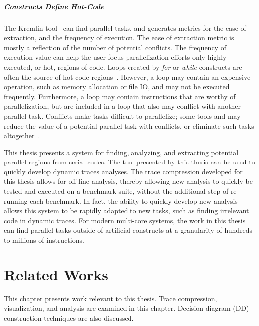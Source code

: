 \documentclass[defaultstyle,11pt]{thesis}
\begin{document}
\noindent\paragraph{Constructs Define Hot-Code}

The Kremlin tool~\cite{garcia:2011:pldi} can find parallel tasks, and
generates metrics for the ease of extraction, and the frequency of
execution.  The ease of extraction metric is mostly a reflection of
the number of potential conflicts.  The frequency of execution value
can help the user focus parallelization efforts only highly
executed, or hot, regions of code.  Loops created by \textit{for} or
\textit{while} constructs are often the source of hot code
regions~\cite{bala:2000:pldi}.  However, a loop may contain an
expensive operation, such as memory allocation or file IO, and may not
be executed frequently.  Furthermore, a loop may contain instructions
that are worthy of parallelization, but are included in a loop that
also may conflict with another parallel task.  Conflicts make tasks
difficult to parallelize; some tools and may reduce the value of a
potential parallel task with conflicts, or eliminate such tasks
altogether~\cite{garcia:2011:pldi}.

This thesis presents a system for finding, analyzing, and extracting
potential parallel regions from serial codes.  The tool presented by
this thesis can be used to quickly develop dynamic traces analyses.
The trace compression developed for this thesis allows for off-line
analysis, thereby allowing new analysis to quickly be tested and
executed on a benchmark suite, without the additional step of
re-running each benchmark.  In fact, the ability to quickly develop new
analysis allows this system to be rapidly adapted to new tasks, such
as finding irrelevant code in dynamic traces.  For modern multi-core
systems, the work in this thesis can find parallel tasks outside of
artificial constructs at a granularity of hundreds to millions of
instructions.

\chapter{Related Works}
\label{chap:background}

This chapter presents work relevant to this thesis.  Trace
compression, visualization, and analysis are examined in this chapter.
Decision diagram (DD) construction techniques are also discussed.
\end{document}
